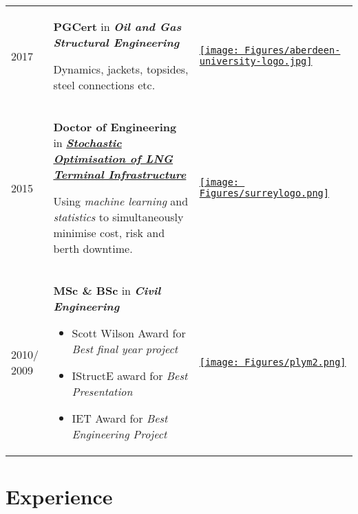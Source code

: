 \documentclass[a4paper]{twentysecondcv} %
\begin{document}
\renewcommand{\arraystretch}{0.5}
\begin{table}[ht]
\centering
\begin{tabular}{p{} p{} m{}}

2017 & \textbf{PGCert} in \textbf{\textit{Oil and Gas Structural Engineering}} 

Dynamics, jackets, topsides, steel connections etc.

& \href{https://www.abdn.ac.uk/study/postgraduate-taught/degree-programmes/217/oil-and-gas-structural-engineering/}{\texttt{[image: Figures/aberdeen-university-logo.jpg]}}\\

2015 & \textbf{Doctor of Engineering} in \href{http://epubs.surrey.ac.uk/812133/1/Rustell.\%20M.\%20Thesis\%202016.pdf}{\textbf{\textit{Stochastic Optimisation of LNG Terminal Infrastructure}}} 

Using \textit{machine learning} and \textit{statistics} to simultaneously minimise cost, risk and berth downtime.

& \href{http://www.surrey.ac.uk}{\texttt{[image: Figures/surreylogo.png]}}\\

2010/ 2009 & \textbf{MSc \& BSc} in \textbf{\textit{Civil Engineering}} 
\begin{itemize}\setlength\parskip{0pt} 
\item  Scott Wilson Award for \textit{Best final year project}
\item IStructE award for \textit{Best Presentation} 
\item IET Award for \textit{Best Engineering Project} 
\end{itemize} &
\href{https://www.plymouth.ac.uk/courses/postgraduate/msc-civil-engineering}{\texttt{[image: Figures/plym2.png]}}\\

\end{tabular}
\end{table}

\section{Experience}
\end{document}
